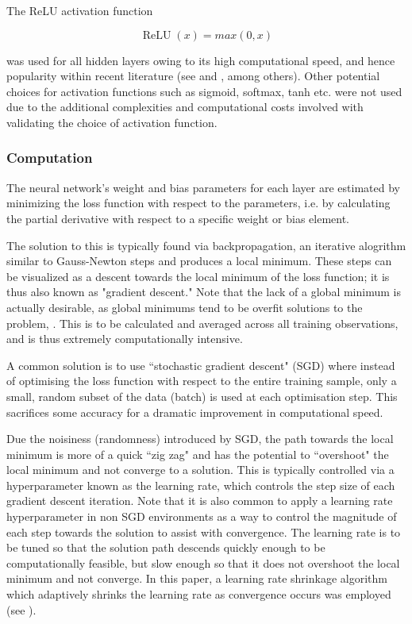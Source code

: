 \documentclass[a4paper, table]{article}
\begin{document}
The ReLU activation function

\begin{equation}
	\operatorname{ReLU}(x) = max(0, x)
\end{equation}

was used for all hidden layers owing to its high computational speed, and hence popularity within recent literature  (see \cite{lecun_deep_2015} and \cite{ramachandran_searching_2017}, among others). Other potential choices for activation functions such as sigmoid, softmax, tanh etc. were not used due to the additional complexities and computational costs involved with validating the choice of activation function.

\subsubsection{Computation}

The neural network's weight and bias parameters for each layer are estimated by minimizing the loss function with respect to the parameters, i.e. by calculating the partial derivative with respect to a specific weight or bias element.

The solution to this is typically found via backpropagation, an iterative alogrithm similar to Gauss-Newton steps and produces a local minimum. These steps can be visualized as a descent towards the local minimum of the loss function; it is thus also known as "gradient descent." Note that the lack of a global minimum is actually desirable, as global minimums tend to be overfit solutions to the problem, \citep{choromanska_loss_2014}. This is to be calculated and averaged across all training observations, and is thus extremely computationally intensive. 

A common solution is to use ``stochastic gradient descent" (SGD) where instead of optimising the loss function with respect to the entire training sample, only a small, random subset of the data (batch) is used at each optimisation step. This sacrifices some accuracy for a dramatic improvement in computational speed.

Due the noisiness (randomness) introduced by SGD, the path towards the local minimum is more of a quick ``zig zag" and has the potential to ``overshoot" the local minimum and not converge to a solution. This is typically controlled via a hyperparameter known as the learning rate, which controls the step size of each gradient descent iteration. Note that it is also common to apply a learning rate hyperparameter in non SGD environments as a way to control the magnitude of each step towards the solution to assist with convergence. The learning rate is to be tuned so that the solution path descends quickly enough to be computationally feasible, but slow enough so that it does not overshoot the local minimum and not converge. In this paper, a learning rate shrinkage algorithm which adaptively shrinks the learning rate as convergence occurs was employed (see \cite{kingma_adam:_2014}).
\end{document}
